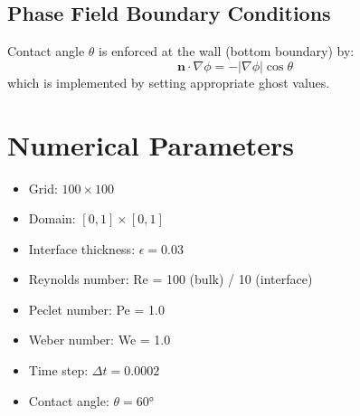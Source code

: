 \documentclass{article}
\begin{document}
\subsection{Phase Field Boundary Conditions}
Contact angle $\theta$ is enforced at the wall (bottom boundary) by:
\begin{equation}
\mathbf{n} \cdot \nabla \phi = -|\nabla \phi| \cos\theta
\end{equation}
which is implemented by setting appropriate ghost values.

\section{Numerical Parameters}
\begin{itemize}
    \item Grid: $100 \times 100$
    \item Domain: $[0,1] \times [0,1]$
    \item Interface thickness: $\epsilon = 0.03$
    \item Reynolds number: Re = 100 (bulk) / 10 (interface)
    \item Peclet number: Pe = 1.0
    \item Weber number: We = 1.0
    \item Time step: $\Delta t = 0.0002$
    \item Contact angle: $\theta = 60°$
\end{itemize}
\end{document}
